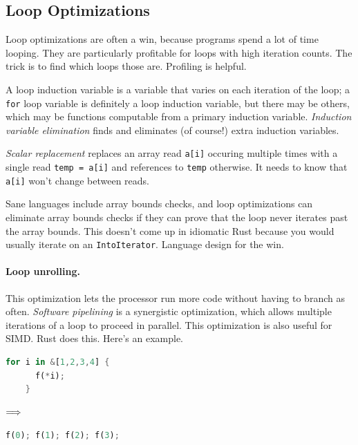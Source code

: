 \documentclass[a4paper]{report}
\begin{document}
\subsection*{Loop Optimizations}
Loop optimizations are often a win, because programs spend a lot of time looping. They are particularly profitable for loops with high iteration counts.
The trick is to find which loops those are.
Profiling is helpful.

A loop induction variable is a variable that varies on each iteration
of the loop; a \texttt{for} loop variable is definitely a loop induction variable,
but there may be others, which may be functions computable from a primary induction variable. \emph{Induction variable elimination} finds and eliminates (of course!) extra induction variables.

\emph{Scalar replacement} replaces an array read {\tt a[i]}
occuring multiple times with a single read {\tt temp = a[i]} and references
to {\tt temp} otherwise. It needs to know that {\tt a[i]} won't change
between reads.

Sane languages include array bounds checks, and loop optimizations
can eliminate array bounds checks if they can prove that the loop
never iterates past the array bounds. This doesn't come up in
idiomatic Rust because you would usually iterate on an
\texttt{IntoIterator}. Language design for the win.

\paragraph{Loop unrolling.} This optimization
lets the processor run more code without having to branch
as often. \emph{Software pipelining} is a synergistic optimization,
which allows multiple iterations of a loop to proceed in parallel.
This optimization is also useful for SIMD. Rust does this. Here's an example.
\begin{center}
\vspace*{-1em}
\begin{minipage}{.3\textwidth}
  \begin{lstlisting}[language=Rust]
    for i in &[1,2,3,4] {
      f(*i);
    }
  \end{lstlisting}
  \end{minipage} $\Longrightarrow \hspace*{2em}$ \begin{minipage}{.4\textwidth}
  \begin{lstlisting}[language=Rust]
f(0); f(1); f(2); f(3);
  \end{lstlisting}
  \end{minipage}
  \end{center}
\end{document}
